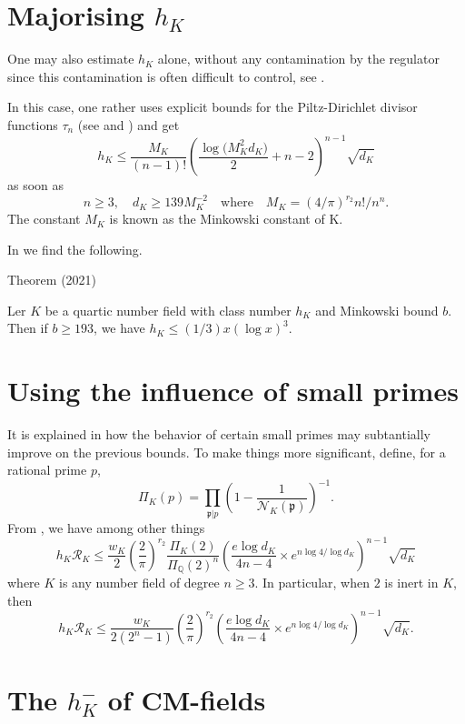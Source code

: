 \section{Majorising $h_K$}



One may also estimate $h_K$ alone, without any contamination by the regulator
since this contamination is often difficult to control,
see \cite{Pohst-Zassenhaus*89}.

In this case, one
rather uses explicit bounds for the Piltz-Dirichlet divisor functions $\tau_n$
(see
\cite{Bordelles*02}
and
\cite{Bordelles*06})
and get
$$
h_K\le \frac{M_K}{(n-1)!}
\left(\frac{\log\bigl(M^2_Kd_K\bigr)}{2}+n-2\right)^{n-1}
\sqrt{d_K}
$$
as soon as
$$
n\ge 3,\quad d_K\ge 139 M_K^{-2}
\quad\text{where}\quad
M_K=(4/\pi)^{r_2}n!/n^n.
$$
The constant $M_K$ is known as the Minkowski constant of K.

In
\cite{Cully-Trudgian*21}
we find the following.
\begin{thm}{Theorem (2021)}

  Ler $K$ be a quartic number field with class number $h_K$ and
  Minkowski bound $b$. Then if $b\ge 193$, we have
  $h_K\le (1/3) x(\log x)^3$.
\end{thm}


\section{Using the influence of small primes}



It is explained in
\cite{Louboutin*05} how the
behavior of certain small primes may subtantially improve on the previous
bounds. To make things more significant, define, for a rational prime $p$,
$$
\Pi_K(p)=\prod_{\mathfrak{p}|p}\left(1-\frac{1}{\mathcal{N}_K(\mathfrak{p})}\right)^{-1}.
$$
From \cite{Louboutin*05}, we have
among other things
$$
h_K\mathcal{R}_K
\le\frac{w_K}{2}
\left(\frac{2}{\pi}\right)^{r_2}
\frac{\Pi_K(2)}{\Pi_{\mathbb{Q}}(2)^n}
\left(\frac{e\log d_K}{4n-4}\times
e^{n\log 4/\log d_K}
\right)^{n-1}\sqrt{d_K}
$$
where $K$ is any number field of degree $n\ge3$. In particular, when $2$ is
inert in $K$, then
$$
h_K\mathcal{R}_K
\le\frac{w_K}{2(2^n-1)}
\left(\frac{2}{\pi}\right)^{r_2}
\left(\frac{e\log d_K}{4n-4}\times
e^{n\log 4/\log d_K}
\right)^{n-1}\sqrt{d_K}.
$$




\section{The $h^-_K$ of CM-fields}



